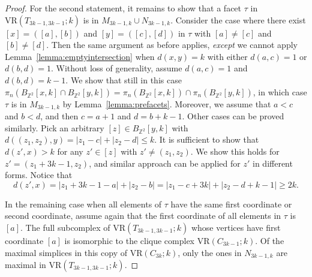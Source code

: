 \documentclass[10pt,a4paper]{amsart}
\newcommand{\Z}{\ensuremath{\mathbb{Z}}}
\newcommand{\vr}[2]{\mathrm{VR}(#1;#2)}
\begin{document}
\begin{proof}
For the second statement, it remains to show that a facet $\tau$ in $\vr{T_{3k-1,3k-1}}{k}$ is in $M_{3k-1,k}\cup N_{3k-1,k}$.
Consider the case where there exist $[x] =([a], [b])$ and $[y]=([c], [d])$ in $\tau$ with $[a]\neq [c]$ and $[b]\neq [d]$.
Then the same argument as before applies, \emph{except} we cannot apply Lemma~\ref{lemma:emptyintersection} when $d(x, y)=k$ with either $d(a, c)=1$ or $d(b, d)=1$.
Without loss of generality, assume $d(a, c)=1$ and $d(b, d)=k-1$.
We show that still in this case $\pi_n (B_{\Z^2}[x, k]\cap B_{\Z^2}[y, k]) =\pi_n(B_{\Z^2}[x, k]) \cap \pi_n(B_{\Z^2}[y, k])$, in which case $\tau$ is in $M_{3k-1,k}$ by Lemma~\ref{lemma:prefacets}.
Moreover, we assume that $a<c$ and $b<d$, and then $c=a+1$ and $d=b+k-1$.
Other cases can be proved similarly.
Pick an arbitrary $[z]\in B_{\Z^2}[y, k]$ with $d((z_1, z_2), y)=|z_1-c|+|z_2-d|\leq k$. 
It is sufficient to show that $d(z', x)>k$ for any $z'\in [z]$ with $z'\neq (z_1, z_2)$.
We show this holds for $z'=(z_1+3k-1, z_2)$, and similar approach can be applied for $z'$ in different forms.
Notice that \[d(z', x)=|z_1+3k-1-a|+|z_2-b|=|z_1-c+3k|+|z_2-d+k-1|\geq 2k.\]   

In the remaining case when all elements of $\tau$ have the same first coordinate or second coordinate, assume again that the first coordinate of all elements in $\tau$ is $[a]$.
The full subcomplex of $\vr{T_{3k-1,3k-1}}{k}$ whose vertices have first coordinate $[a]$ is isomorphic to the clique complex $\vr{C_{3k-1}}{k}$.
Of the maximal simplices in this copy of $\vr{C_{3k}}{k}$, only the ones in $N_{3k-1,k}$ are maximal in $\vr{T_{3k-1,3k-1}}{k}$.
\end{proof}
\end{document}
